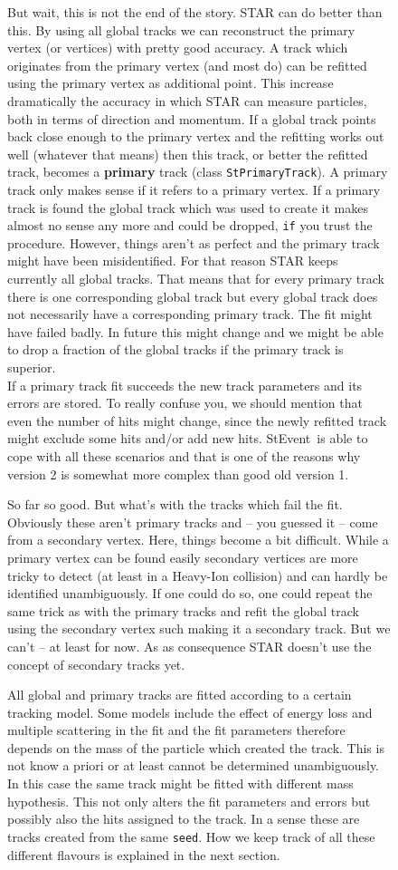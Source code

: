 \documentclass[twoside]{article}
\newcommand{\StEvent}{\textsf{StEvent}}
\begin{document}
\begin{figure}[htb]
\begin{center}
But wait, this is not the end of the story. STAR can do better than
this. By using all global tracks we can reconstruct the primary vertex
(or vertices) with pretty good accuracy. A track which originates from
the primary vertex (and most do) can be refitted using the primary
vertex as additional point.  This increase dramatically the accuracy
in which STAR can measure particles, both in terms of direction and
momentum.  If a global track points back close enough to the primary
vertex and the refitting works out well (whatever that means) then
this track, or better the refitted track, becomes a \textbf{primary}
track (class \texttt{StPrimaryTrack}). A primary track only makes
sense if it refers to a primary vertex.  If a primary track is found
the global track which was used to create it makes almost no sense any
more and could be dropped, \texttt{if} you trust the procedure.
However, things aren't as perfect and the primary track might have
been misidentified.  For that reason STAR keeps currently all global
tracks. That means that for every primary track there is one
corresponding global track but every global track does not necessarily
have a corresponding primary track. The fit might have failed badly.
In future this might change and we might be able to drop
a fraction of the global tracks if the primary track is superior. \\
If a primary track fit succeeds the new track parameters and its
errors are stored.  To really confuse you, we should mention that even
the number of hits might change, since the newly refitted track might
exclude some hits and/or add new hits.  \StEvent\ is able to cope with
all these scenarios and that is one of the reasons why version 2 is
somewhat more complex than good old version 1.

So far so good. But what's with the tracks which fail the fit.
Obviously these aren't primary tracks and -- you guessed it -- come
from a secondary vertex.  Here, things become a bit difficult. While a
primary vertex can be found easily secondary vertices are more tricky
to detect (at least in a Heavy-Ion collision) and can hardly be
identified unambiguously. If one could do so, one could repeat the
same trick as with the primary tracks and refit the global track using
the secondary vertex such making it a secondary track. But we can't --
at least for now. As as consequence STAR doesn't use the concept of
secondary tracks yet.

All global and primary tracks are fitted according to a certain
tracking model. Some models include the effect of energy loss and
multiple scattering in the fit and the fit parameters therefore
depends on the mass of the particle which created the track. This is
not know a priori or at least cannot be determined unambiguously. In
this case the same track might be fitted with different mass
hypothesis.  This not only alters the fit parameters and errors but
possibly also the hits assigned to the track.  In a sense these are
tracks created from the same \texttt{seed}. How we keep track of all
these different flavours is explained in the next section.


\end{center}
\end{figure}
\end{document}
